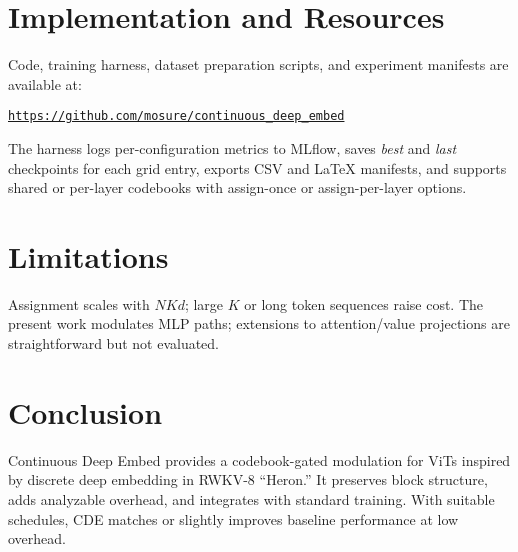 \documentclass[11pt]{article}
\begin{document}
\section{Implementation and Resources}
Code, training harness, dataset preparation scripts, and experiment manifests are available at:
\begin{center}
\href{https://github.com/mosure/continuous_deep_embed}{\texttt{https://github.com/mosure/continuous\_deep\_embed}}
\end{center}
The harness logs per-configuration metrics to MLflow, saves \emph{best} and \emph{last} checkpoints for each grid entry, exports CSV and \LaTeX{} manifests, and supports shared or per-layer codebooks with assign-once or assign-per-layer options.

\section{Limitations}
Assignment scales with $NKd$; large $K$ or long token sequences raise cost. The present work modulates MLP paths; extensions to attention/value projections are straightforward but not evaluated.

\section{Conclusion}
Continuous Deep Embed provides a codebook-gated modulation for ViTs inspired by discrete deep embedding in RWKV-8 ``Heron.'' It preserves block structure, adds analyzable overhead, and integrates with standard training. With suitable schedules, CDE matches or slightly improves baseline performance at low overhead.
\end{document}
